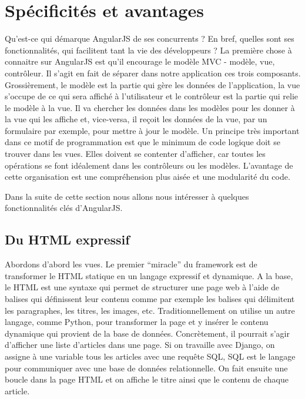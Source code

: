 \documentclass[letterpaper,10pt,oneside]{sphinxmanual}
\begin{document}
\section{Spécificités et avantages}
\label{angularjs:specificites-et-avantages}
Qu'est-ce qui démarque AngularJS de ses concurrents ? En bref, quelles sont ses fonctionnalités, qui facilitent tant la vie des développeurs ? La première chose à connaitre sur AngularJS est qu'il encourage le modèle MVC - modèle, vue, contrôleur. Il s'agit en fait de séparer dans notre application ces trois composants. Grossièrement, le modèle est la partie qui gère les données de l'application, la vue s'occupe de ce qui sera affiché à l'utilisateur et le contrôleur est la partie qui relie le modèle à la vue. Il va chercher les données dans les modèles pour les donner à la vue qui les affiche et, vice-versa, il reçoit les données de la vue, par un formulaire par exemple, pour mettre à jour le modèle. Un principe très important dans ce motif de programmation est que le minimum de code logique doit se trouver dans les vues. Elles doivent se contenter d'afficher, car toutes les opérations se font idéalement dans les contrôleurs ou les modèles. L'avantage de cette organisation est une compréhension plus aisée et une modularité du code.

Dans la suite de cette section nous allons nous intéresser à quelques fonctionnalités clés d'AngularJS.


\subsection{Du HTML expressif}
\label{angularjs:du-html-expressif}
Abordons d'abord les vues. Le premier ``miracle'' du framework est de transformer le HTML statique en un langage expressif et dynamique. A la base, le HTML est une syntaxe qui permet de structurer une page web à l'aide de balises qui définissent leur contenu comme par exemple les balises qui délimitent les paragraphes, les titres, les images, etc. Traditionnellement on utilise un autre langage, comme Python, pour transformer la page et y insérer le contenu dynamique qui provient de la base de données. Concrètement, il pourrait s'agir d'afficher une liste d'articles dans une page. Si on travaille avec Django, on assigne à une variable  tous les articles avec une requête SQL, SQL est le langage pour communiquer avec une base de données relationnelle. On fait ensuite une boucle dans la page HTML et on affiche le titre ainsi que le contenu de chaque article.
\end{document}
